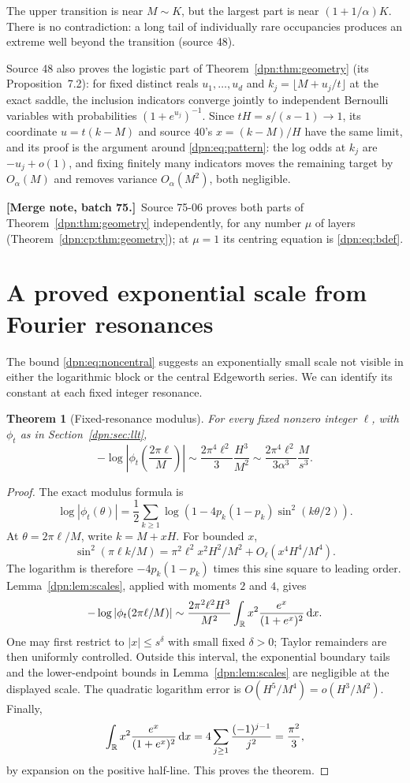 \documentclass[11pt]{article}
\numberwithin{equation}{section}
\newtheorem{theorem}{Theorem}[section]
\theoremstyle{definition}\newtheorem{definition}[theorem]{Definition}
\theoremstyle{remark}\newtheorem{remark}[theorem]{Remark}
\newcommand{\dd}{\,\mathrm d}\newcommand{\ii}{\mathrm i}
\newcommand{\src}[1]{\textup{(source #1)}}
\newcommand{\mergenoteb}[1]{\par\smallskip\noindent\textbf{[Merge note, batch 75.]}\ #1\par\smallskip}
\begin{document}
The upper transition is near $M\sim K$, but the largest part is near
$(1+1/\alpha)K$.  There is no contradiction: a long tail of individually rare
occupancies produces an extreme well beyond the transition \src{48}.

Source 48 also proves the logistic part of Theorem~\ref{dpn:thm:geometry} (its
Proposition~7.2): for fixed distinct reals $u_1,\dots,u_d$ and
$k_j=\lfloor M+u_j/t\rfloor$ at the exact saddle, the inclusion indicators
converge jointly to independent Bernoulli variables with probabilities
$(1+e^{u_j})^{-1}$.  Since $tH=s/(s-1)\to1$, its coordinate $u=t(k-M)$ and
source 40's $x=(k-M)/H$ have the same limit, and its proof is the argument
around \eqref{dpn:eq:pattern}: the log odds at $k_j$ are $-u_j+o(1)$, and
fixing finitely many indicators moves the remaining target by $O_\alpha(M)$
and removes variance $O_\alpha(M^2)$, both negligible.
\mergenoteb{Source 75-06 proves both parts of Theorem~\ref{dpn:thm:geometry}
independently, for any number $\mu$ of layers
(Theorem~\ref{dpn:cp:thm:geometry}); at $\mu=1$ its centring equation is
\eqref{dpn:eq:bdef}.}

\section{A proved exponential scale from Fourier resonances}\label{dpn:sec:resonance}
The bound \eqref{dpn:eq:noncentral} suggests an exponentially small scale not
visible in either the logarithmic block or the central Edgeworth series.
We can identify its constant at each fixed integer resonance.

\begin{theorem}[Fixed-resonance modulus]\label{dpn:thm:resonance}
For every fixed nonzero integer $\ell$, with $\phi_t$ as in
Section~\ref{dpn:sec:llt},
\begin{equation}\label{dpn:eq:resonance}
 -\log\left|\phi_t\left(\frac{2\pi\ell}{M}\right)\right|
 \sim\frac{2\pi^4\ell^2}{3}\frac{H^3}{M^2}
 \sim\frac{2\pi^4\ell^2}{3\alpha^3}\frac M{s^3}.
\end{equation}
\end{theorem}
\begin{proof}
The exact modulus formula is
\[
 \log|\phi_t(\theta)|
  =\frac12\sum_{k\ge1}\log\left(1-4p_k(1-p_k)
                                    \sin^2(k\theta/2)\right).
\]
At $\theta=2\pi\ell/M$, write $k=M+xH$. For bounded $x$,
\[
 \sin^2(\pi\ell k/M)
 =\pi^2\ell^2 x^2H^2/M^2+O_\ell(x^4H^4/M^4).
\]
The logarithm is therefore $-4p_k(1-p_k)$ times this sine square to leading
order. Lemma~\ref{dpn:lem:scales}, applied with moments $2$ and $4$, gives
\[
 -\log|\phi_t(2\pi\ell/M)|
 \sim\frac{2\pi^2\ell^2H^3}{M^2}
     \int_\R x^2\frac{e^x}{(1+e^x)^2}\dd x.
\]
One may first restrict to $|x|\le s^\delta$ with small fixed $\delta>0$;
Taylor remainders are then uniformly controlled. Outside this interval,
the exponential boundary tails and the lower-endpoint bounds in
Lemma~\ref{dpn:lem:scales} are negligible at the displayed scale. The quadratic
logarithm error is $O(H^5/M^4)=o(H^3/M^2)$.
Finally,
\[
 \int_\R x^2\frac{e^x}{(1+e^x)^2}\dd x
 =4\sum_{j\ge1}\frac{(-1)^{j-1}}{j^2}=\frac{\pi^2}{3},
\]
by expansion on the positive half-line. This proves the theorem.
\end{proof}
\end{document}
